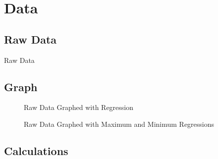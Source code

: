 \section{Data}

\subsection{Raw Data}
\begin{table}[h]
  \caption{Raw Data}
  \label{tbl:rwdata}
\end{table}

\subsection{Graph}
\begin{figure}[h]
  \centering
  \caption{Raw Data Graphed with Regression}
  \label{fig:rwgrphreg}
\end{figure}
\begin{figure}
  \centering
  \caption{Raw Data Graphed with Maximum and Minimum Regressions}
  \label{fig:rwgrphmaxminreg}
\end{figure}

\subsection{Calculations}
